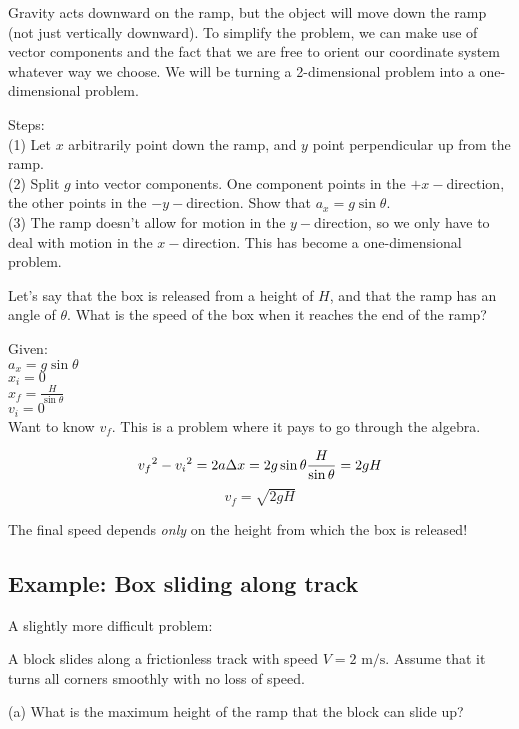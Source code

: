 Gravity acts downward on the ramp, but the object will move down the ramp (not just vertically downward). To simplify the problem, we can make use of vector components and the fact that we are free to orient our coordinate system whatever way we choose. We will be turning a 2-dimensional problem into a one-dimensional problem.

Steps:\\
(1) Let $x$ arbitrarily point down the ramp, and $y$ point perpendicular up from the ramp.\\
(2) Split $g$ into vector components. One component points in the $+x-$direction, the other points in the $-y-$direction. Show that $a_x=g\sin\theta$.\\
(3) The ramp doesn't allow for motion in the $y-$direction, so we only have to deal with motion in the $x-$direction. This has become a one-dimensional problem.

Let's say that the box is released from a height of $H$, and that the ramp has an angle of $\theta$. What is the speed of the box when it reaches the end of the ramp?

Given:\\
$a_x=g\sin\theta$\\
$x_i=0$\\
$x_f=\frac{H}{\sin\theta}$\\
$v_i=0$\\

Want to know $v_f$. This is a problem where it pays to go through the algebra.

$$v_f\displaystyle^2-v_i\displaystyle^2=2a\Delta{x}=2g\sin\theta\frac{H}{\sin\theta}=2gH$$
$$v_f=\sqrt{2gH}$$

The final speed depends \textit{only} on the height from which the box is released!

\subsection{Example: Box sliding along track}
A slightly more difficult problem:

A block slides along a frictionless track with speed $V=2\mbox{ m/s}$. Assume that it turns all corners smoothly with no loss of speed.


\vspace{6cm}

(a) What is the maximum height of the ramp that the block can slide up?

